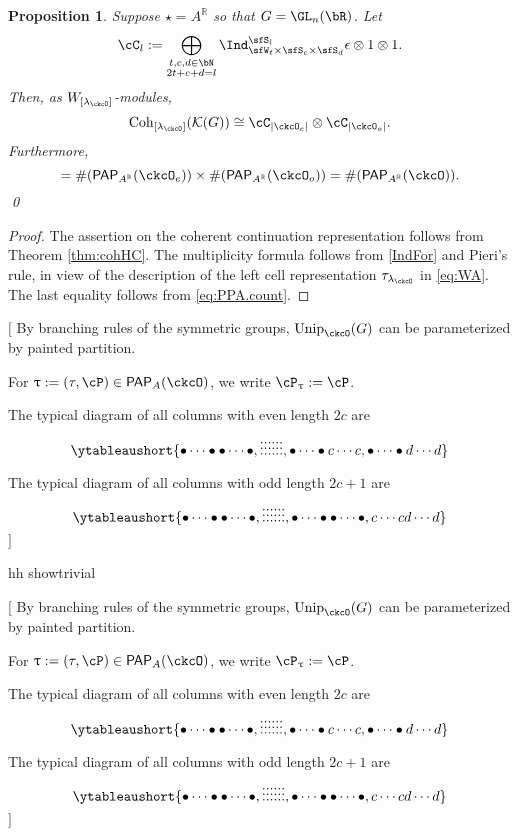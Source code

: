 \documentclass[12pt,a4paper]{amsart}
\let\ytb=\ytableaushort
\newcommand{\trivial}[2][]{\if\relax\detokenize{#1}\relax
  {%
      \color{orange} \vspace{0em} $[$  #2 $]$
      \color{black}
  }
  \else
\ifx#1h
\ifcsname showtrivial\endcsname
{%
    \color{orange} \vspace{0em}  $[$ #2 $]$
    \color{black}
}
\fi
\else {\red Wrong argument!} \fi
\fi
}
\def\abs#1{\left|{#1}\right|}
\newcommand{\CK}{{\mathcal {K}}}
\newcommand{\sgn}{\operatorname{sgn}}
\newcommand{\R}{\mathbb R}
\numberwithin{equation}{section}
\newtheorem{prop}[thm]{Proposition}
\theoremstyle{remark}
\def\Unip{\mathrm{Unip}}
\def\lamck{\lambda_\ckcO}
\def\Wint#1{W_{[#1]}}
\def\Cint#1{\Coh_{[#1]}}
\def\PP{\mathsf{PAP}}
\def\Coh{\mathrm{Coh}}
\begin{document}
\begin{prop} \label{lem:GL.count}
  Suppose $\star=A^\R$ so that $G = \GL_{n}(\bR)$. Let
  \[
    \cC_l := \bigoplus_{\substack{t,c,d\in \bN \\2t+c+d=l}} \Ind_{\sfW_t\times \sfS_c\times \sfS_d}^{\sfS_{l}} \epsilon \otimes 1\otimes 1.
  \]
  Then, as $W_{[\lamck]}$-modules,
  \[
    \Cint{\lamck}(\CK(G)) \cong \cC_{\abs{\ckcO_{e}}}\otimes \cC_{\abs{\ckcO_{o}}}.
  \]
  Furthermore,
  \begin{equation*}%
    [\tau_{\lamck}: \Cint{\lamck}(\CK(G))] = \# (\PP_{A^\R}(\ckcO_{e}))\times
    \# (\PP_{A^\R}(\ckcO_{o})) = \# (\PP_{A^\R}(\ckcO)).
  \end{equation*}
  \qed
\end{prop}
\begin{proof}
  The assertion on the coherent continuation representation follows from Theorem \ref{thm:cohHC}.
  The multiplicity formula follows from \eqref{IndFor} and Pieri's rule, in view of the description of the left cell representation $\tau_{\lamck}$ in \eqref{eq:WA}.  The last equality
  follows from \eqref{eq:PPA.count}.
\end{proof}

\trivial[h]{
By branching rules of the symmetric groups, $\Unip_{\ckcO}(G)$ can be
parameterized by painted partition.

For $\uptau:=(\tau,\cP)\in \PP_{A}(\ckcO)$, we write $\cP_{\uptau}:= \cP$.

  The typical diagram of all columns with even length $2c$ are
  \[
    \ytb{\bullet\cdots\bullet\bullet\cdots\bullet,\vdots\vdots\vdots\vdots\vdots\vdots, \bullet\cdots\bullet c\cdots c, \bullet\cdots\bullet d\cdots d }
  \]

  The typical diagram of all columns with odd length $2c+1$ are
  \[
    \ytb{\bullet\cdots\bullet\bullet\cdots\bullet,\vdots\vdots\vdots\vdots\vdots\vdots, \bullet\cdots\bullet \bullet\cdots\bullet , c\cdots c d\cdots d }
  \]
}
\end{document}
